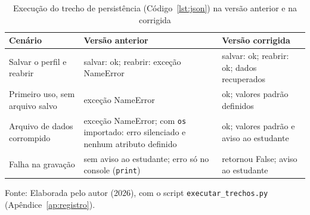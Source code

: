\begin{table}[htb]
\centering
\caption{Execução do trecho de persistência (Código~\ref{lst:json}) na versão anterior e na corrigida}
\label{tab:execucao-persistencia}
\footnotesize
\begin{tabular}{L{3.2cm} L{5.6cm} L{5.6cm}}
\hline
Cenário & Versão anterior & Versão corrigida \\ \hline
Salvar o perfil e reabrir & salvar: ok; reabrir: exceção NameError & salvar: ok; reabrir: ok; dados recuperados \\ \hline
Primeiro uso, sem arquivo salvo & exceção NameError & ok; valores padrão definidos \\ \hline
Arquivo de dados corrompido & exceção NameError; com \texttt{os} importado: erro silenciado e nenhum atributo definido & ok; valores padrão e aviso ao estudante \\ \hline
Falha na gravação & sem aviso ao estudante; erro só no console (\texttt{print}) & retornou False; aviso ao estudante \\ \hline
\end{tabular}
\par\vspace{0.1cm}
{\small Fonte: Elaborada pelo autor (2026), com o script \texttt{executar\_trechos.py} (Apêndice~\ref{ap:registro}).}
\end{table}
